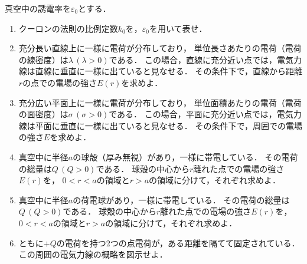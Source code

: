\documentclass[../../../physics-standard_questions_all.tex]{subfiles}
\begin{document}
真空中の誘電率を$\varepsilon_0$とする．

\begin{enumerate}

    \item クーロンの法則の比例定数$k_0$を，$\varepsilon_0$を用いて表せ．
    
    \item 充分長い直線上に一様に電荷が分布しており，
    単位長さあたりの電荷（電荷の線密度）は$\lambda \, (\lambda>0)$である．
    この場合，直線に充分近い点では，電気力線は直線に垂直に一様に出ていると見なせる．
    その条件下で，直線から距離$r$の点での電場の強さ$E(r)$を求めよ．

    \item 充分広い平面上に一様に電荷が分布しており，
    単位面積あたりの電荷（電荷の面密度）は$\sigma \, (\sigma>0)$である．
    この場合，平面に充分近い点では，電気力線は平面に垂直に一様に出ていると見なせる．
    その条件下で，周囲での電場の強さ$E$を求めよ．

    \item 真空中に半径$a$の球殻（厚み無視）があり，一様に帯電している．
    その電荷の総量は$Q \, (Q>0)$である．
    球殻の中心から$r$離れた点での電場の強さ$E(r)$を，
    $0<r<a$の領域と$r>a$の領域に分けて，それぞれ求めよ．

    \item 真空中に半径$a$の荷電球があり，一様に帯電している．
    その電荷の総量は$Q \, (Q>0)$である．
    球殻の中心から$r$離れた点での電場の強さ$E(r)$を，
    $0<r<a$の領域と$r>a$の領域に分けて，それぞれ求めよ．

    \item ともに$+Q$の電荷を持つ2つの点電荷が，ある距離を隔てて固定されている．
    この周囲の電気力線の概略を図示せよ．

\end{enumerate}
\end{document}
